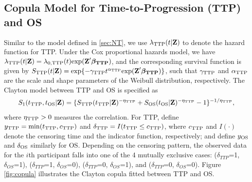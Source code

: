 \subsection{Copula Model for Time-to-Progression (TTP) and OS} \label{sec:method_copula}
Similar to the model defined in  \ref{sec:NT}, we use $\lambda_{\rm TTP}(t|\textbf{Z})$ to
denote the hazard function for TTP. Under the Cox
proportional hazards model, we have $\lambda_{\rm TTP}(t|\textbf{Z})=\lambda_{0, \rm TTP}(t)\mathrm{exp}(\textbf{Z}' \boldsymbol{\beta_{\rm TTP}})$, and the corresponding survival function is given by
$S_{\rm TTP}(t|\textbf{Z})=\mathrm{exp}\{-\gamma_{\rm TTP} t^{\alpha_{\rm TTP}}
\mathrm{exp}(\textbf{Z}' \boldsymbol{\beta_{\rm TTP}} )\}$, such that $\gamma_{\rm TTP}$ and $\alpha_{\rm TTP}$ are the scale and shape parameters
of the Weibull distribution, respectively. The Clayton model between \ac{TTP} and \ac{OS} is specified as
\begin{equation*}
S_1(t_{\rm TTP},
t_{\rm OS}|\textbf{Z})=\{S_{\rm TTP}(t_{\rm TTP}|\textbf{Z})^{-\eta_{\rm TTP}}
+S_{\rm OS}(t_{\rm OS}|\textbf{Z})^{-\eta_{\rm TTP}}-1\}^{-1/\eta_{\rm TTP}}, 
\end{equation*}
where $\eta_{\rm TTP}>0$ measures the correlation.
For TTP,
define $y_{\rm TTP}=\mathrm{min}(t_{\rm TTP}, c_{\rm TTP})$ and
$\delta_{\rm TTP}=I(t_{\rm TTP} \le c_{\rm TTP})$,
where $c_{\rm TTP}$ and $I(\cdot)$ denote the censoring time and the indicator function,
respectively; and define $y_{\rm OS}$ and $\delta_{\rm OS}$ similarly for OS. Depending on the censoring pattern, the observed data for the $i$th participant falls into one of the 4 mutually exclusive cases: ($\delta_{TTP}$=1, $\delta_{OS}$=1), ($\delta_{TTP}$=1, $\delta_{OS}$=0),
($\delta_{TTP}$=0, $\delta_{OS}$=1), and ($\delta_{TTP}$=0, $\delta_{OS}$=0).  Figure \ref{fig:copula} illustrates the Clayton copula fitted between \ac{TTP} and OS.


